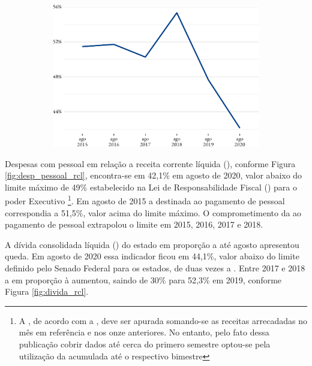\begin{figure}[!h]
\begin{subfigure}{\linewidth}
		\includegraphics{fig/desp_pessoal_rcl-1.pdf}
	\end{subfigure}
\end{figure}

Despesas com pessoal em relação a receita corrente líquida (),
conforme Figura \ref{fig:desp_pessoal_rcl}, encontra-se em 42,1\% em agosto
de 2020, valor abaixo do limite máximo de 49\% estabelecido na Lei de
Responsabilidade Fiscal () para o poder Executivo
\footnote{A , de acordo com a , deve ser apurada somando-se as receitas arrecadadas no mês em referência e nos onze anteriores. No entanto, pelo fato  dessa publicação cobrir dados até cerca do primero semestre optou-se pela utilização da  acumulada até o respectivo bimestre}.
Em agosto de 2015 a  destinada ao pagamento de pessoal
correspondia a 51,5\%, valor acima do limite máximo. O comprometimento
da  ao pagamento de pessoal extrapolou o limite em 2015, 2016,
2017 e 2018.

A dívida consolidada líquida () do estado em proporção a
 até agosto apresentou queda. Em agosto de 2020 essa indicador
ficou em 44,1\%, valor abaixo do limite definido pelo Senado Federal
para os estados, de duas vezes a . Entre 2017 e 2018 a
 em proporção à  aumentou, saindo de 30\% para
52,3\% em 2019, conforme Figura \ref{fig:divida_rcl}.

